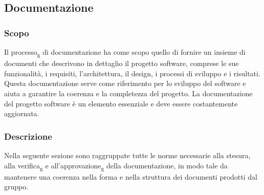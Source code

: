 \subsection{Documentazione}
\subsubsection{Scopo}
Il processo\textsubscript{g} di documentazione ha come scopo quello di fornire un insieme di documenti che descrivono in dettaglio il progetto software, comprese le sue funzionalità, i requisiti, l'architettura, il design, i processi di sviluppo e i risultati. 
Questa documentazione serve come riferimento per lo sviluppo del software e aiuta a garantire la coerenza e la completezza del progetto. 
La documentazione del progetto software è un elemento essenziale e deve essere costantemente aggiornata.
\subsubsection{Descrizione}
Nella seguente sezione sono raggruppate tutte le norme necessarie alla stesura, alla verifica\textsubscript{g} e 
all’approvazione\textsubscript{g} della documentazione, in modo tale da mantenere una coerenza nella forma e nella 
struttura dei documenti prodotti dal gruppo.





